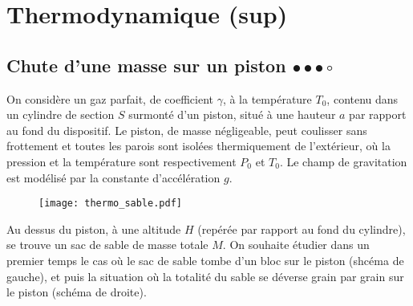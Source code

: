 \chapter{Thermodynamique (sup)}

\newpage

\section{Chute d'une masse sur un piston $\bullet\bullet\bullet\circ$}

On considère un gaz parfait, de coefficient $\gamma$, à la température $T_0$, contenu dans un cylindre de section $S$ surmonté d'un piston, situé à une hauteur $a$ par rapport au fond du dispositif. Le piston, de masse négligeable, peut coulisser sans frottement et toutes les parois sont isolées thermiquement de l'extérieur, où la pression et la température sont respectivement $P_0$ et $T_0$. Le champ de gravitation est modélisé par la constante d'accélération $g$.

\begin{figure}[h!]
\centering
  \texttt{[image: thermo\_sable.pdf]}
\end{figure}

Au dessus du piston, à une altitude $H$ (repérée par rapport au fond du cylindre), se trouve un sac de sable de masse totale $M$. On souhaite étudier dans un premier temps le cas où le sac de sable tombe d'un bloc sur le piston (shcéma de gauche), et puis la situation où la totalité du sable se déverse grain par grain sur le piston (schéma de droite).

